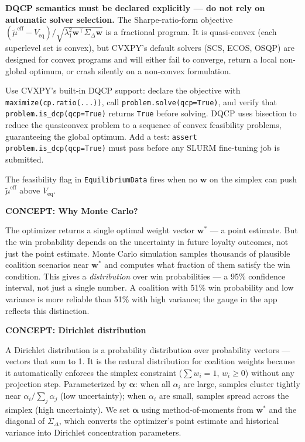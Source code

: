 \documentclass[11pt]{article}
\newcommand{\concept}[2]{%
  \begin{mdframed}[style=conceptbox]
  {\small\bfseries\color{bluefg}CONCEPT: #1}\par\smallskip #2
  \end{mdframed}}
\newcommand{\veq}{V_{\mathrm{eq}}}
\begin{document}
\begin{mdframed}[style=warnbox]
\textbf{DQCP semantics must be declared explicitly --- do not rely on automatic
solver selection.}
The Sharpe-ratio-form objective $(\tilde{\mu}^{\text{eff}} - \veq)
/ \sqrt{\lambda_1^2 \mathbf{w}^\top \Sigma_\Delta \mathbf{w}}$ is a fractional
program. It is quasi-convex (each superlevel set is convex), but CVXPY's default
solvers (SCS, ECOS, OSQP) are designed for convex programs and will either fail
to converge, return a local non-global optimum, or crash silently on a
non-convex formulation.

Use CVXPY's built-in DQCP support: declare the objective with
\texttt{maximize(cp.ratio(...))}, call
\texttt{problem.solve(qcp=True)}, and verify that \texttt{problem.is\_dcp(qcp=True)}
returns \texttt{True} before solving. DQCP uses bisection to reduce the quasiconvex
problem to a sequence of convex feasibility problems, guaranteeing the global
optimum. Add a test: \texttt{assert problem.is\_dcp(qcp=True)} must pass before any
SLURM fine-tuning job is submitted.
\end{mdframed}
The feasibility flag in \texttt{EquilibriumData} fires when no $\mathbf{w}$
on the simplex can push $\tilde{\mu}^{\text{eff}}$ above $\veq$.

\concept{Why Monte Carlo?}{
The optimizer returns a single optimal weight vector $\mathbf{w}^*$ --- a point
estimate. But the win probability depends on the uncertainty in future loyalty
outcomes, not just the point estimate. Monte Carlo simulation samples thousands of
plausible coalition scenarios near $\mathbf{w}^*$ and computes what fraction of
them satisfy the win condition. This gives a \emph{distribution} over win
probabilities --- a 95\% confidence interval, not just a single number. A coalition
with 51\% win probability and low variance is more reliable than 51\% with high
variance; the gauge in the app reflects this distinction.
}

\concept{Dirichlet distribution}{
A Dirichlet distribution is a probability distribution over probability vectors ---
vectors that sum to 1. It is the natural distribution for coalition weights because
it automatically enforces the simplex constraint ($\sum w_i = 1$, $w_i \geq 0$)
without any projection step. Parameterized by $\boldsymbol{\alpha}$: when all
$\alpha_i$ are large, samples cluster tightly near $\alpha_i / \sum_j \alpha_j$
(low uncertainty); when $\alpha_i$ are small, samples spread across the simplex
(high uncertainty). We set $\boldsymbol{\alpha}$ using method-of-moments from
$\mathbf{w}^*$ and the diagonal of $\Sigma_\Delta$, which converts the optimizer's
point estimate and historical variance into Dirichlet concentration parameters.
}
\end{document}
